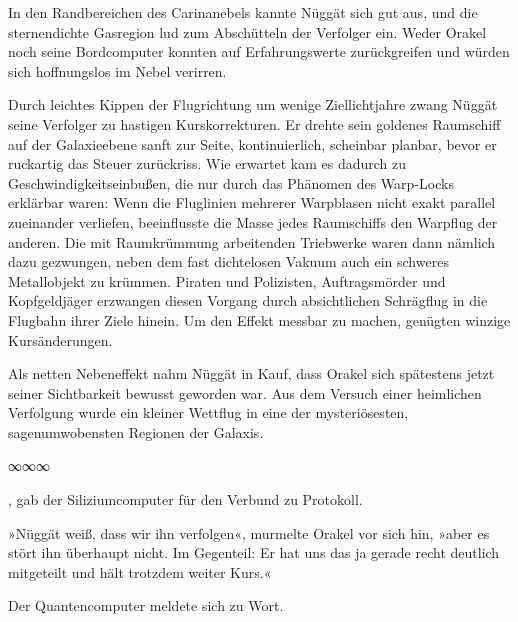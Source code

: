 In den Randbereichen des Carinanebels kannte Nüggät sich gut aus, und die sternendichte Gasregion lud zum Abschütteln der Verfolger ein. Weder Orakel noch seine Bordcomputer konnten auf Erfahrungswerte zurückgreifen und würden sich hoffnungslos im Nebel verirren.

Durch leichtes Kippen der Flugrichtung um wenige Ziellichtjahre zwang Nüggät seine Verfolger zu hastigen Kurskorrekturen. Er drehte sein goldenes Raumschiff auf der Galaxieebene sanft zur Seite, kontinuierlich, scheinbar planbar, bevor er ruckartig das Steuer zurückriss. Wie erwartet kam es dadurch zu Geschwindigkeitseinbußen, die nur durch das Phänomen des Warp-Locks erklärbar waren: Wenn die Fluglinien mehrerer Warpblasen nicht exakt parallel zueinander verliefen, beeinflusste die Masse jedes Raumschiffs den Warpflug der anderen. Die mit Raumkrümmung arbeitenden Triebwerke waren dann nämlich dazu gezwungen, neben dem fast dichtelosen Vakuum auch ein schweres Metallobjekt zu krümmen. Piraten und Polizisten, Auftragsmörder und Kopfgeldjäger erzwangen diesen Vorgang durch absichtlichen Schrägflug in die Flugbahn ihrer Ziele hinein.  Um den Effekt messbar zu machen, genügten winzige Kursänderungen.

Als netten Nebeneffekt nahm Nüggät in Kauf, dass Orakel sich spätestens jetzt seiner Sichtbarkeit bewusst geworden war. Aus dem Versuch einer heimlichen Verfolgung wurde ein kleiner Wettflug in eine der mysteriösesten, sagenumwobensten Regionen der Galaxis.

\begin{center}
∞∞∞
\end{center}

, gab der Siliziumcomputer für den Verbund zu Protokoll. 

»Nüggät weiß, dass wir ihn verfolgen«, murmelte Orakel vor sich hin, »aber es stört ihn überhaupt nicht. Im Gegenteil: Er hat uns das ja gerade recht deutlich mitgeteilt und hält trotzdem weiter Kurs.«

Der Quantencomputer meldete sich zu Wort. 

